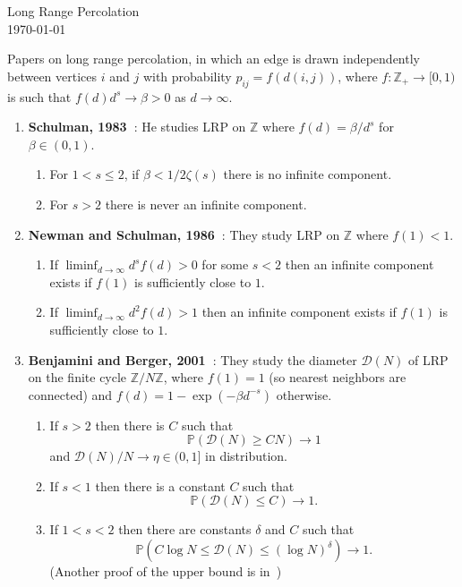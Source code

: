 \documentclass[11pt,letterpaper]{article}
\newcommand{\prob}[1]{\mathbb{P}\left(#1\right)}
\newcommand{\D}{\mathcal{D}}
\begin{document}
\begin{center}
{\LARGE Long Range Percolation} \\
\today
\end{center}

Papers on long range percolation, in which an edge is drawn independently between vertices $i$ and $j$ with probability $p_{ij} = f(d(i,j))$, where $f: \mathbb{Z}_+ \to [0,1)$ is such that $f(d)d^s \to \beta>0$ as $d \to \infty$.

\begin{enumerate}
\item {\bf Schulman, 1983~\cite{Schulman:1983}}: He studies LRP on $\mathbb{Z}$ where $f(d) = \beta/d^s$ for $\beta \in (0,1)$.
\begin{enumerate}
\item For $1<s\leq 2$, if $\beta < 1/2\zeta(s)$ there is no infinite component.
\item For $s>2$ there is never an infinite component.
\end{enumerate}

\item {\bf Newman and Schulman, 1986~\cite{NS:1986}}: They study LRP on $\mathbb{Z}$ where $f(1)<1$.
\begin{enumerate}
\item If $\displaystyle \liminf_{d\to\infty} d^s f(d) >0$ for some $s<2$ then an infinite component exists if $f(1)$ is sufficiently close to $1$.
\item If $\displaystyle \liminf_{d\to\infty} d^2 f(d) >1$ then an infinite component exists if $f(1)$ is sufficiently close to $1$.
\end{enumerate}


\item {\bf Benjamini and Berger, 2001~\cite{BB:2001}}:  They study the diameter $\D(N)$ of LRP on the finite cycle $\mathbb{Z}/N\mathbb{Z}$, where $f(1) = 1$ (so nearest neighbors are connected) and $f(d) = 1 -\exp(-\beta d^{-s})$ otherwise.
\begin{enumerate}
\item If $s>2$ then there is $C$ such that
$$\prob{\D(N)\geq CN} \to 1 $$
and $\D(N)/N \to \eta \in (0,1]$ in distribution.

\item If $s<1$ then there is a constant $C$ such that
$$ \prob{\D(N)\leq C} \to 1. $$

\item If $1<s<2$ then there are constants $\delta$ and $C$ such that
$$ \prob{C \log N \leq \D(N) \leq (\log N)^\delta} \to 1.$$
(Another proof of the upper bound is in~\cite{CGS:2002})


\end{enumerate}
\end{enumerate}
\end{document}

